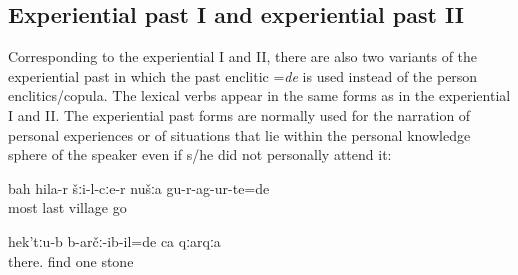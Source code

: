 
\subsection{Experiential past I and experiential past II}
\label{ssec:Experiential past I and experiential past II}

Corresponding to the experiential I and II, there are also two variants of the experiential past in which the past enclitic =\textit{de} is used instead of the person enclitics\slash copula. The lexical verbs appear in the same forms as in the experiential I and II. The experiential past forms are normally used for the narration of personal experiences or of situations that lie within the personal knowledge sphere of the speaker even if s/he did not personally attend it:
%
\begin{exe}
	\ex	\label{ex:As the very last we moved away from the village analytic}
	\gll	bah	hila-r šːi-l-cːe-r	nušːa	gu-r-ag-ur-te=de\\
		most	last	village		go\\
	\glt	{}

	\ex	\label{ex:‎Up there we found a stone analytic}
	\gll	hek'tːu-b	b-arčː-ib-il=de	ca	qːarqːa\\
		there.	find	one	stone\\
	\glt	{}
\end{exe}

